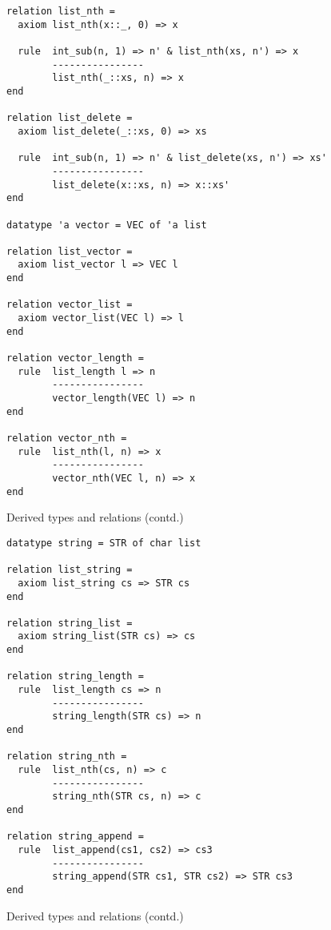 \begin{figure}[htbp]
\begin{verbatim}
relation list_nth =
  axiom list_nth(x::_, 0) => x

  rule  int_sub(n, 1) => n' & list_nth(xs, n') => x
        ----------------
        list_nth(_::xs, n) => x
end

relation list_delete =
  axiom list_delete(_::xs, 0) => xs

  rule  int_sub(n, 1) => n' & list_delete(xs, n') => xs'
        ----------------
        list_delete(x::xs, n) => x::xs'
end

datatype 'a vector = VEC of 'a list

relation list_vector =
  axiom list_vector l => VEC l
end

relation vector_list =
  axiom vector_list(VEC l) => l
end

relation vector_length =
  rule  list_length l => n
        ----------------
        vector_length(VEC l) => n
end

relation vector_nth =
  rule  list_nth(l, n) => x
        ----------------
        vector_nth(VEC l, n) => x
end
\end{verbatim}
\caption{Derived types and relations (contd.)}
\end{figure}

\begin{figure}[htbp]
\begin{verbatim}
datatype string = STR of char list

relation list_string =
  axiom list_string cs => STR cs
end

relation string_list =
  axiom string_list(STR cs) => cs
end

relation string_length =
  rule  list_length cs => n
        ----------------
        string_length(STR cs) => n
end

relation string_nth =
  rule  list_nth(cs, n) => c
        ----------------
        string_nth(STR cs, n) => c
end

relation string_append =
  rule  list_append(cs1, cs2) => cs3
        ----------------
        string_append(STR cs1, STR cs2) => STR cs3
end
\end{verbatim}
\caption{Derived types and relations (contd.)}
\end{figure}
